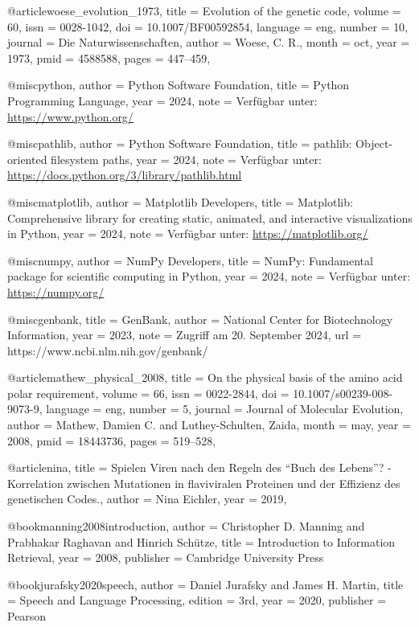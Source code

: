 \documentclass[german,version-2022-01]{uzl-thesis}
\begin{document}
\begin{bibtex-entries}
@article{woese_evolution_1973,
	title = {Evolution of the genetic code},
	volume = {60},
	issn = {0028-1042},
	doi = {10.1007/BF00592854},
	language = {eng},
	number = {10},
	journal = {Die Naturwissenschaften},
	author = {Woese, C. R.},
	month = oct,
	year = {1973},
	pmid = {4588588},
	pages = {447--459},
}

@misc{python,
  author = {Python Software Foundation},
  title = {Python Programming Language},
  year = {2024},
  note = {Verf\"ugbar unter: \url{https://www.python.org/}}
}

@misc{pathlib,
  author = {Python Software Foundation},
  title = {pathlib: Object-oriented filesystem paths},
  year = {2024},
  note = {Verf\"ugbar unter: \url{https://docs.python.org/3/library/pathlib.html}}
}

@misc{matplotlib,
  author = {Matplotlib Developers},
  title = {Matplotlib: Comprehensive library for creating static, animated, and interactive visualizations in Python},
  year = {2024},
  note = {Verf\"ugbar unter: \url{https://matplotlib.org/}}
}

@misc{numpy,
  author = {NumPy Developers},
  title = {NumPy: Fundamental package for scientific computing in Python},
  year = {2024},
  note = {Verf\"ugbar unter: \url{https://numpy.org/}}
}

@misc{genbank,
  title = {GenBank},
  author = {{National Center for Biotechnology Information}},
  year = {2023},
  note = {Zugriff am 20. September 2024},
  url = {https://www.ncbi.nlm.nih.gov/genbank/}
}

@article{mathew_physical_2008,
	title = {On the physical basis of the amino acid polar requirement},
	volume = {66},
	issn = {0022-2844},
	doi = {10.1007/s00239-008-9073-9},
	language = {eng},
	number = {5},
	journal = {Journal of Molecular Evolution},
	author = {Mathew, Damien C. and Luthey-Schulten, Zaida},
	month = may,
	year = {2008},
	pmid = {18443736},
	pages = {519--528},
}

@article{nina,
	title = {Spielen Viren nach den Regeln des "`Buch des Lebens"'? - Korrelation zwischen Mutationen in flaviviralen Proteinen und der Effizienz des genetischen Codes.},
	author = {Nina Eichler},
	year = {2019},
}

@book{manning2008introduction,
  author    = {Christopher D. Manning and Prabhakar Raghavan and Hinrich Sch\"utze},
  title     = {Introduction to Information Retrieval},
  year      = {2008},
  publisher = {Cambridge University Press}
}

@book{jurafsky2020speech,
  author    = {Daniel Jurafsky and James H. Martin},
  title     = {Speech and Language Processing},
  edition   = {3rd},
  year      = {2020},
  publisher = {Pearson}
}


\end{bibtex-entries}
\end{document}
